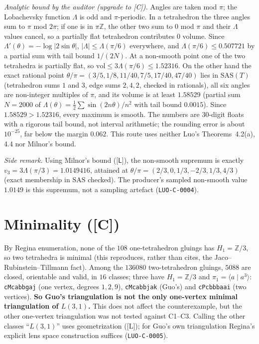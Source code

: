 \documentclass[10pt]{article}
\newcommand{\tier}[1]{\textsf{[#1]}}
\newcommand{\tL}{\tier{L}}
\newcommand{\tC}{\tier{C}}
\newcommand{\Lob}{\Lambda}
\begin{document}
\emph{Analytic bound by the auditor (upgrade to \tC{}).} Angles are taken mod $\pi$; the Lobachevsky function $\Lob$ is odd and $\pi$-periodic. In a tetrahedron the three angles sum to $\pi$ mod $2\pi$; if one is in $\pi\mathbb Z$, the other two sum to $0$ mod $\pi$ and their $\Lob$ values cancel, so a partially flat tetrahedron contributes $0$ volume. Since $\Lob'(\theta)=-\log|2\sin\theta|$, $|\Lob|\le\Lob(\pi/6)$ everywhere, and $\Lob(\pi/6)\le0.507721$ by a partial sum with tail bound $1/(2N)$. At a non-smooth point one of the two tetrahedra is partially flat, so $\mathrm{vol}\le3\Lob(\pi/6)\le1.52316$. On the other hand the exact rational point $\theta/\pi=(3/5,1/8,11/40,7/5,17/40,47/40)$ lies in $\mathrm{SAS}(T)$ (tetrahedron sums $1$ and $3$, edge sums $2,4,2$, checked in rationals), all six angles are non-integer multiples of $\pi$, and its volume is at least $1.58529$ (partial sum $N=2000$ of $\Lob(\theta)=\tfrac12\sum\sin(2n\theta)/n^2$ with tail bound $0.0015$). Since $1.58529>1.52316$, every maximum is smooth. The numbers are 30-digit floats with a rigorous tail bound, not interval arithmetic; the rounding error is about $10^{-25}$, far below the margin $0.062$. This route uses neither Luo's Theorems~4.2(a), 4.4 nor Milnor's bound.

\emph{Side remark.} Using Milnor's bound ($\tL$), the non-smooth supremum is exactly $v_3=3\Lob(\pi/3)=1.0149416$, attained at $\theta/\pi=(2/3,0,1/3,-2/3,1/3,4/3)$ (exact membership in $\mathrm{SAS}$ checked). The producer's sampled non-smooth value $1.0149$ is this supremum, not a sampling artefact (\texttt{LUO-C-0004}).

\section{Minimality (\tC{})}\label{sec:min}
By Regina enumeration, none of the $108$ one-tetrahedron gluings has $H_1=\mathbb Z/3$, so two tetrahedra is minimal (this reproduces, rather than cites, the Jaco--Rubinstein--Tillmann fact). Among the $136080$ two-tetrahedron gluings, $5088$ are closed, orientable and valid, in $16$ classes; three have $H_1=\mathbb Z/3$ and $\pi_1=\langle a\mid a^3\rangle$: \texttt{cMcabbgaj} (one vertex, degrees $1,2,9$), \texttt{cMcabbjak} (Guo's) and \texttt{cPcbbbaai} (two vertices). \textbf{So Guo's triangulation is not the only one-vertex minimal triangulation of $L(3,1)$.} This does not affect the counterexample, but the other one-vertex triangulation was not tested against C1--C3. Calling the other classes ``$L(3,1)$'' uses geometrization (\tL{}); for Guo's own triangulation Regina's explicit lens space construction suffices (\texttt{LUO-C-0005}).
\end{document}
